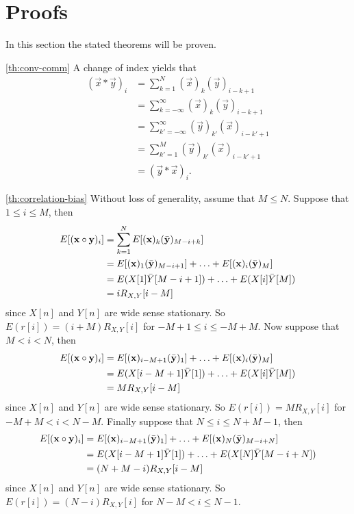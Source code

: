 \documentclass[a4paper, openany, oneside]{memoir}
\begin{document}
\section{Proofs}
\label{sec:proofs}
In this section the stated theorems will be proven.

\begin{blockProofTheorem}{\ref{th:conv-comm}}
    A change of index yields that
    \begin{align*}
        (\vec{x} \ast \vec{y})_i &= \sum_{k=1}^{N} (\vec{x})_k (\vec{y})_{i-k+1} \\
        &= \sum_{k=-\infty}^{\infty} (\vec{x})_k (\vec{y})_{i-k+1} \\
        &= \sum_{k'=-\infty}^{\infty} (\vec{y})_{k'} (\vec{x})_{i-k'+1} \\
        &= \sum_{k'=1}^{M} (\vec{y})_{k'} (\vec{x})_{i-k'+1} \\
        &= (\vec{y} \ast \vec{x})_i.
    \end{align*}
\end{blockProofTheorem}

\begin{blockProofTheorem}{\ref{th:correlation-bias}}
    Without loss of generality, assume that $M \le N$. Suppose that $1 \le i \le M$, then
    \begin{align*}
        E[(\boldsymbol{\mathbf{x}} \circ \boldsymbol{\mathbf{y}})_i] &= \sum_{k=1}^N E[(\boldsymbol{\mathbf{x}})_k (\bar{\boldsymbol{\mathbf{y}}
        })_{M-i+k}] \\
        &= E[(\boldsymbol{\mathbf{x}})_1 (\bar{\boldsymbol{\mathbf{y}}})_{M-i+1}] + \ldots + E[(\boldsymbol{\mathbf{x}})_i (\bar{\boldsymbol{\mathbf{y}}})_{M}] \\
        &= E(X[1] \bar{Y}[M-i+1]) + \ldots + E(X[i] \bar{Y}[M])  \\
        &= i R_{X,Y}[i-M]
    \end{align*}
    since $X[n]$ and $Y[n]$ are wide sense stationary. So $E(r[i])=(i+M)R_{X,Y}[i]$ for $-M + 1\le i \le -M+M$. Now suppose that $M < i < N$, then
    \begin{align*}
        E[(\boldsymbol{\mathbf{x}} \circ \boldsymbol{\mathbf{y}})_i] &= E[(\boldsymbol{\mathbf{x}})_{i-M+1} (\bar{\boldsymbol{\mathbf{y}}})_{1}] + \ldots + E[(\boldsymbol{\mathbf{x}})_i (\bar{\boldsymbol{\mathbf{y}}})_{M}] \\
        &= E(X[i-M+1] \bar{Y}[1]) + \ldots + E(X[i] \bar{Y}[M]) \\  
        &= M R_{X,Y}[i-M]
    \end{align*}
    since $X[n]$ and $Y[n]$ are wide sense stationary. So $E(r[i])=M R_{X,Y}[i]$ for $-M+M<i<N-M$. Finally suppose that $N \le i \le N +M - 1$, then
    \begin{align*}
        E[(\boldsymbol{\mathbf{x}} \circ \boldsymbol{\mathbf{y}})_i] &= E[(\boldsymbol{\mathbf{x}})_{i-M+1} (\bar{\boldsymbol{\mathbf{y}}})_{1}] + \ldots + E[(\boldsymbol{\mathbf{x}})_N (\bar{\boldsymbol{\mathbf{y}}})_{M-i+N}] \\
        &= E(X[i-M+1] \bar{Y}[1]) + \ldots + E(X[N] \bar{Y}[M-i+N]) \\
        &= (N+M-i) R_{X,Y}[i-M]
    \end{align*}
    since $X[n]$ and $Y[n]$ are wide sense stationary. So $E(r[i])=(N-i)R_{X,Y}[i]$ for $N-M<i\le N-1$.
\end{blockProofTheorem}
\end{document}
